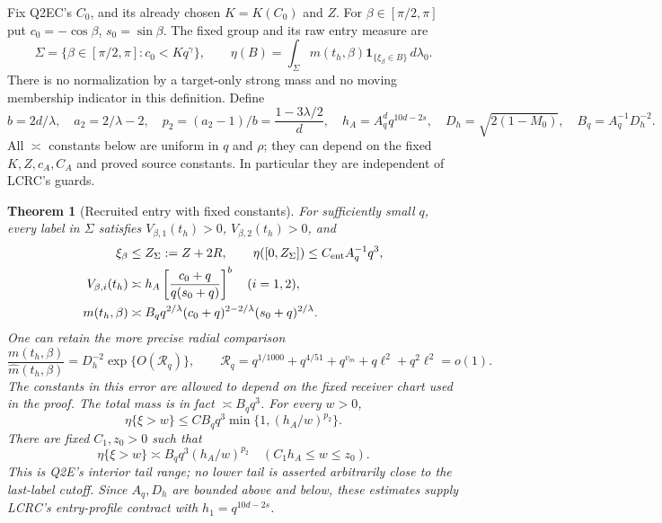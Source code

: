 \documentclass[11pt]{article}
\newtheorem{theorem}{Theorem}[section]
\theoremstyle{remark}\newtheorem{remark}[theorem]{Remark}
\newcommand{\dd}{\,d}
\newcommand{\one}{\mathbf1}
\begin{document}
Fix Q2EC's $C_0$, and its already chosen $K=K(C_0)$ and $Z$.
For $\beta\in[\pi/2,\pi]$ put $c_0=-\cos\beta$, $s_0=\sin\beta$.
The fixed group and its raw entry measure are
\[
 \Sigma=\{\beta\in[\pi/2,\pi]:c_0<Kq^\gamma\},\qquad
 \eta(B)=\int_\Sigma m(t_h,\beta)\one_{\{\xi_\beta\in B\}}\dd\lambda_0.
\]
There is no normalization by a target-only strong mass and no
moving membership indicator in this definition. Define
\begin{equation}
 b=2d/\lambda,\quad a_2=2/\lambda-2,\quad
 p_2=(a_2-1)/b=\frac{1-3\lambda/2}{d},\quad
 h_A=A_q^d q^{10d-2s},\quad
 D_h=\sqrt{2(1-M_0)},\quad B_q=A_q^{-1}D_h^{-2}.
 \label{an02sepv1:scales}
\end{equation}
All $\asymp$ constants below are uniform in $q$ and $\rho$;
they can depend on the fixed $K,Z,c_A,C_A$ and proved source
constants. In particular they are independent of LCRC's guards.

\begin{theorem}[Recruited entry with fixed constants]
\label{an02sepv1:main}
For sufficiently small $q$, every label in $\Sigma$ satisfies
$V_{\beta,1}(t_h)>0$, $V_{\beta,2}(t_h)>0$, and
\begin{align}
 \xi_\beta&\le Z_\Sigma:=Z+2R,\qquad
       \eta([0,Z_\Sigma])\le C_{\rm ent} A_q^{-1}q^3,\label{an02sepv1:cap}\\
 V_{\beta,i}(t_h)&\asymp h_A
       \left[\frac{c_0+q}{q(s_0+q)}\right]^b\quad(i=1,2),
       \label{an02sepv1:labelshape}\\
 m(t_h,\beta)&\asymp B_q q^{2/\lambda}
       (c_0+q)^{2-2/\lambda}(s_0+q)^{2/\lambda}.
       \label{an02sepv1:labelweight}
\end{align}
One can retain the more precise radial comparison
\begin{equation}
 \frac{m(t_h,\beta)}{\widehat m(t_h,\beta)}
   =D_h^{-2}\exp\{O(\mathcal R_q)\},\qquad
 \mathcal R_q=q^{1/1000}+q^{4/51}+q^{v_m}+q\ell^2+q^2\ell^2=o(1).
 \label{an02sepv1:radialfactor}
\end{equation}
The constants in this error are allowed to depend on the fixed
receiver chart used in the proof.
The total mass is in fact $\asymp B_q q^3$. For every $w>0$,
\begin{equation}
 \eta\{\xi>w\}\le C B_q q^3
             \min\{1,(h_A/w)^{p_2}\}.
 \label{an02sepv1:tailupper}
\end{equation}
There are fixed $C_1,z_0>0$ such that
\begin{equation}
 \eta\{\xi>w\}\asymp B_q q^3(h_A/w)^{p_2}
       \quad(C_1h_A\le w\le z_0).
 \label{an02sepv1:taillower}
\end{equation}
This is Q2E's interior tail range; no lower tail is asserted
arbitrarily close to the last-label cutoff.
Since $A_q,D_h$ are bounded above and below, these estimates
supply LCRC's entry-profile contract with $h_1=q^{10d-2s}$.
\end{theorem}
\end{document}
